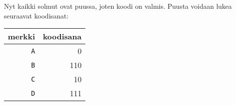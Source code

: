 Nyt kaikki solmut ovat puussa, joten koodi on valmis.
Puusta voidaan lukea seuraavat koodisanat:
\begin{center}
\begin{tabular}{rr}
merkki & koodisana \\
\hline
\texttt{A} & 0 \\
\texttt{B} & 110 \\
\texttt{C} & 10 \\
\texttt{D} & 111 \\
\end{tabular}
\end{center}

% 
% 
% 
% 
